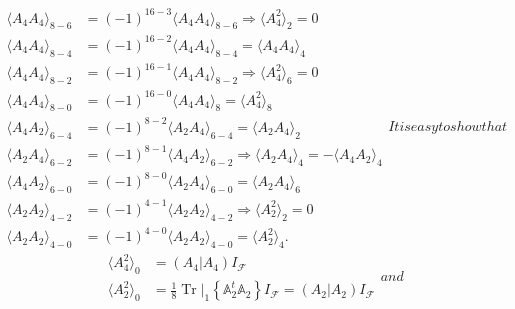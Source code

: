 \documentclass[aps, preprint]{revtex4}
\begin{document}
\label{contraccond}
\begin{subequations}
\begin{align} \langle A_{4} A_{4} \rangle _{8 -6} &  =\left ( -1\right )^{16 -3}  \langle A_{4} A_{4} \rangle _{8 -6} \Rightarrow  \langle A_{4}^{2} \rangle _{2} =0 \label{4-2-2} \\
 \langle A_{4} A_{4} \rangle _{8 -4} &  =\left ( -1\right )^{16 -2}  \langle A_{4} A_{4} \rangle _{8 -4} = \langle A_{4} A_{4} \rangle _{4} \label{4-4-4} \\
 \langle A_{4} A_{4} \rangle _{8 -2} &  =\left ( -1\right )^{16 -1}  \langle A_{4} A_{4} \rangle _{8 -2} \Rightarrow  \langle A_{4}^{2} \rangle _{6} =0 \label{4-4-6} \\
 \langle A_{4} A_{4} \rangle _{8 -0} &  =\left ( -1\right )^{16 -0}  \langle A_{4} A_{4} \rangle _{8} = \langle A_{4}^{2} \rangle _{8} \label{4-4-8} \\
 \langle A_{4} A_{2} \rangle _{6 -4} &  =\left ( -1\right )^{8 -2}  \langle A_{2} A_{4} \rangle _{6 -4} = \langle A_{2} A_{4} \rangle _{2} \label{4-2--2} \\
 \langle A_{2} A_{4} \rangle _{6 -2} &  =\left ( -1\right )^{8 -1}  \langle A_{4} A_{2} \rangle _{6 -2} \Rightarrow  \langle A_{2} A_{4} \rangle _{4} = - \langle A_{4} A_{2} \rangle _{4} \label{2-4-4} \\
 \langle A_{4} A_{2} \rangle _{6 -0} &  =\left ( -1\right )^{8 -0}  \langle A_{2} A_{4} \rangle _{6 -0} = \langle A_{2} A_{4} \rangle _{6} \label{4-2-6} \\
 \langle A_{2} A_{2} \rangle _{4 -2} &  =\left ( -1\right )^{4 -1}  \langle A_{2} A_{2} \rangle _{4 -2} \Rightarrow  \langle A_{2}^{2} \rangle _{2} =0 \label{2-2-2} \\
 \langle A_{2} A_{2} \rangle _{4 -0} &  =\left ( -1\right )^{4 -0}  \langle A_{2} A_{2} \rangle _{4 -0} = \langle A_{2}^{2} \rangle _{4} . \label{2-2-0}\end{align}It is easy to show that
\end{subequations}
\begin{subequations}
\begin{align} \langle A_{4}^{2} \rangle _{0} &  =\left (\left .A_{4}\right \vert A_{4}\right ) I_{\mathcal{F}} \\
 \langle A_{2}^{2} \rangle _{0} &  =\frac{1}{8} \left .\ensuremath{\operatorname*{Tr}}\right \vert _{1} \left \{\mathbb{A}_{2}^{t} \mathbb{A}_{2}\right \} I_{\mathcal{F}} =\left (\left .A_{2}\right \vert A_{2}\right ) I_{\mathcal{F}}\end{align}and
\end{subequations}
\end{document}
